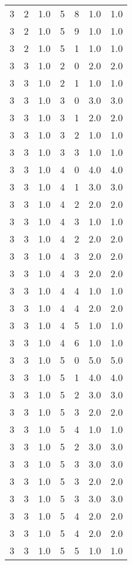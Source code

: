 \documentclass[a4paper,12pt]{article}
\begin{document}
\begin{center}
\begin{longtable}{ c c c | c c c | c }
        3 & 2 & 1.0 & 5 & 8 & 1.0 & 1.0 \\
        3 & 2 & 1.0 & 5 & 9 & 1.0 & 1.0 \\
        3 & 2 & 1.0 & 5 & 1 & 1.0 & 1.0 \\
        3 & 3 & 1.0 & 2 & 0 & 2.0 & 2.0 \\
        3 & 3 & 1.0 & 2 & 1 & 1.0 & 1.0 \\
        3 & 3 & 1.0 & 3 & 0 & 3.0 & 3.0 \\
        3 & 3 & 1.0 & 3 & 1 & 2.0 & 2.0 \\
        3 & 3 & 1.0 & 3 & 2 & 1.0 & 1.0 \\
        3 & 3 & 1.0 & 3 & 3 & 1.0 & 1.0 \\
        3 & 3 & 1.0 & 4 & 0 & 4.0 & 4.0 \\
        3 & 3 & 1.0 & 4 & 1 & 3.0 & 3.0 \\
        3 & 3 & 1.0 & 4 & 2 & 2.0 & 2.0 \\
        3 & 3 & 1.0 & 4 & 3 & 1.0 & 1.0 \\
        3 & 3 & 1.0 & 4 & 2 & 2.0 & 2.0 \\
        3 & 3 & 1.0 & 4 & 3 & 2.0 & 2.0 \\
        3 & 3 & 1.0 & 4 & 3 & 2.0 & 2.0 \\
        3 & 3 & 1.0 & 4 & 4 & 1.0 & 1.0 \\
        3 & 3 & 1.0 & 4 & 4 & 2.0 & 2.0 \\
        3 & 3 & 1.0 & 4 & 5 & 1.0 & 1.0 \\
        3 & 3 & 1.0 & 4 & 6 & 1.0 & 1.0 \\
        3 & 3 & 1.0 & 5 & 0 & 5.0 & 5.0 \\
        3 & 3 & 1.0 & 5 & 1 & 4.0 & 4.0 \\
        3 & 3 & 1.0 & 5 & 2 & 3.0 & 3.0 \\
        3 & 3 & 1.0 & 5 & 3 & 2.0 & 2.0 \\
        3 & 3 & 1.0 & 5 & 4 & 1.0 & 1.0 \\
        3 & 3 & 1.0 & 5 & 2 & 3.0 & 3.0 \\
        3 & 3 & 1.0 & 5 & 3 & 3.0 & 3.0 \\
        3 & 3 & 1.0 & 5 & 3 & 2.0 & 2.0 \\
        3 & 3 & 1.0 & 5 & 3 & 3.0 & 3.0 \\
        3 & 3 & 1.0 & 5 & 4 & 2.0 & 2.0 \\
        3 & 3 & 1.0 & 5 & 4 & 2.0 & 2.0 \\
        3 & 3 & 1.0 & 5 & 5 & 1.0 & 1.0 \\

\end{longtable}
\end{center}
\end{document}
